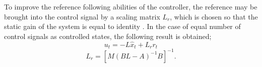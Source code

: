     To improve the reference following abilities of the controller,
    the reference may be brought into the control signal by a scaling
    matrix $L_{r}$, which is chosen so that the static gain of the
    system is equal to identity \citep{glad2003reglerteori}.
    In the case of equal number of control signals as controlled
    states, the following result is obtained;
    \begin{equation}
    \label{eq:controller:u}
        u_{t} = -L\hat{x}_{t} + L_{r}r_{t}
    \end{equation}
    \begin{equation}
    \label{eq:controller:Lr}
        L_{r} = \left[M(BL - A)^{-1}B\right]^{-1}.
    \end{equation}

